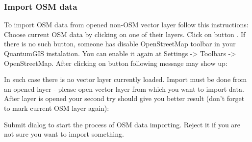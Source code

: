 \subsubsection{Import OSM data}  

To import OSM data from opened non-OSM vector layer follow this instructions:
Choose current OSM data by clicking on one of their layers.
Click on  button   .
If there is no such button, someone has disable OpenStreetMap toolbar in your
QuantumGIS instalation. You can enable it again at
Settings -> Toolbars -> OpenStreetMap.
After clicking on button following message may show up:

In such case there is no vector layer currently loaded. Import must be done
from an opened layer - please open vector layer from which you want to import
data. After layer is opened your second try should give you better result
(don't forget to mark current OSM layer again):

Submit dialog to start the process of OSM data importing.
Reject it if you are not sure you want to import something.


